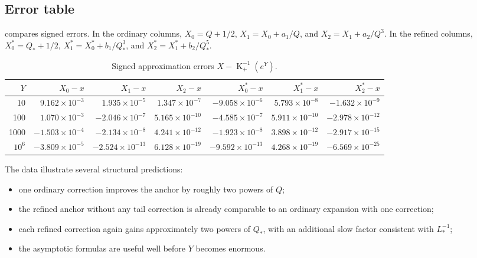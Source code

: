 \documentclass[11pt,oneside]{article}
\theoremstyle{plain}
\theoremstyle{definition}
\theoremstyle{remark}
\newcommand{\Kfun}{\operatorname{K}}
\begin{document}
\subsection{Error table}

 compares signed errors.  In the ordinary columns,
\(X_0=Q+1/2\), \(X_1=X_0+a_1/Q\), and
\(X_2=X_1+a_2/Q^3\).  In the refined columns,
\(X_0^*=Q_*+1/2\), \(X_1^*=X_0^*+b_1/Q_*^3\), and
\(X_2^*=X_1^*+b_2/Q_*^5\).

\begin{table}[htbp]
\centering
\caption{Signed approximation errors \(X-\Kfun_+^{-1}(e^Y)\).}
\label{tab:numerical-errors}
\small
\setlength{\tabcolsep}{3pt}
\begin{tabular}{@{}r rrr rrr@{}}
\toprule
\(Y\) & \(X_0-x\) & \(X_1-x\) & \(X_2-x\) &
\(X_0^*-x\) & \(X_1^*-x\) & \(X_2^*-x\)\\
\midrule
10
& \(9.162\times10^{-3}\) & \(1.935\times10^{-5}\) & \(1.347\times10^{-7}\)
& \(-9.058\times10^{-6}\) & \(5.793\times10^{-8}\) & \(-1.632\times10^{-9}\)\\
100
& \(1.070\times10^{-3}\) & \(-2.046\times10^{-7}\) & \(5.165\times10^{-10}\)
& \(-4.585\times10^{-7}\) & \(5.911\times10^{-10}\) & \(-2.978\times10^{-12}\)\\
1000
& \(-1.503\times10^{-4}\) & \(-2.134\times10^{-8}\) & \(4.241\times10^{-12}\)
& \(-1.923\times10^{-8}\) & \(3.898\times10^{-12}\) & \(-2.917\times10^{-15}\)\\
\(10^6\)
& \(-3.809\times10^{-5}\) & \(-2.524\times10^{-13}\) & \(6.128\times10^{-19}\)
& \(-9.592\times10^{-13}\) & \(4.268\times10^{-19}\) & \(-6.569\times10^{-25}\)\\
\bottomrule
\end{tabular}
\end{table}

The data illustrate several structural predictions:
\begin{itemize}
\item one ordinary correction improves the anchor by roughly two powers of
      \(Q\);
\item the refined anchor without any tail correction is already comparable to
      an ordinary expansion with one correction;
\item each refined correction again gains approximately two powers of \(Q_*\),
      with an additional slow factor consistent with \(L_*^{-1}\);
\item the asymptotic formulas are useful well before \(Y\) becomes enormous.
\end{itemize}
\end{document}
